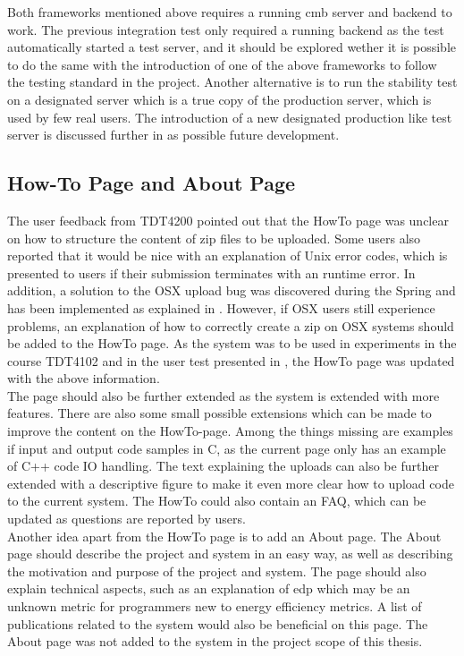 Both frameworks mentioned above requires a running \gls{cmb} server and backend to work. The previous integration test only required a running backend as the test automatically started a test server, and it should be explored wether it is possible to do the same with the introduction of one of the above frameworks to follow the testing standard in the project. Another alternative is to run the stability test on a designated server which is a true copy of the production server, which is used by few real users. The introduction of a new designated production like test server is discussed further in  as possible future development.

\subsection{How-To Page and About Page}
\label{sub-sec:prop-howto}
The user feedback from TDT4200 \cite{TDT4200} pointed out that the HowTo page was unclear on how to structure the content of zip files to be uploaded. Some users also reported that it would be nice with an explanation of Unix error codes, which is presented to users if their submission terminates with an runtime error. In addition, a solution to the OSX upload bug was discovered during the Spring and has been implemented as explained in . However, if OSX users still experience problems, an explanation of how to correctly create a zip on OSX systems should be added to the HowTo page. As the system was to be used in experiments in the course TDT4102 \cite{TDT4102} and in the user test presented in , the HowTo page was updated with the above information. \\

The page should also be further extended as the system is extended with more features. There are also some small possible extensions which can be made to improve the content on the HowTo-page. Among the things missing are examples if input and output code samples in C, as the current page only has an example of C++ code IO handling. The text explaining the uploads can also be further extended with a descriptive figure to make it even more clear how to upload code to the current system. The HowTo could also contain an FAQ, which can be updated as questions are reported by users. \\

Another idea apart from the HowTo page is to add an About page. The About page should describe the project and system in an easy way, as well as describing the motivation and purpose of the project and system. The page should also explain technical aspects, such as an explanation of \gls{edp} which may be an unknown metric for programmers new to energy efficiency metrics. A list of publications related to the system would also be beneficial on this page. The About page was not added to the system in the project scope of this thesis.

